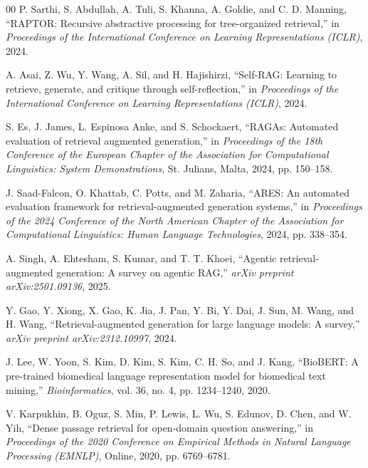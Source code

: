 \documentclass[conference]{IEEEtran}
\begin{document}
\begin{thebibliography}{00}
P. Sarthi, S. Abdullah, A. Tuli, S. Khanna, A. Goldie, and C. D. Manning, ``RAPTOR: Recursive abstractive processing for tree-organized retrieval,'' in \emph{Proceedings of the International Conference on Learning Representations (ICLR)}, 2024.

A. Asai, Z. Wu, Y. Wang, A. Sil, and H. Hajishirzi, ``Self-RAG: Learning to retrieve, generate, and critique through self-reflection,'' in \emph{Proceedings of the International Conference on Learning Representations (ICLR)}, 2024.

S. Es, J. James, L. Espinosa Anke, and S. Schockaert, ``RAGAs: Automated evaluation of retrieval augmented generation,'' in \emph{Proceedings of the 18th Conference of the European Chapter of the Association for Computational Linguistics: System Demonstrations}, St. Julians, Malta, 2024, pp. 150--158.

J. Saad-Falcon, O. Khattab, C. Potts, and M. Zaharia, ``ARES: An automated evaluation framework for retrieval-augmented generation systems,'' in \emph{Proceedings of the 2024 Conference of the North American Chapter of the Association for Computational Linguistics: Human Language Technologies}, 2024, pp. 338--354.

A. Singh, A. Ehtesham, S. Kumar, and T. T. Khoei, ``Agentic retrieval-augmented generation: A survey on agentic RAG,'' \emph{arXiv preprint arXiv:2501.09136}, 2025.

Y. Gao, Y. Xiong, X. Gao, K. Jia, J. Pan, Y. Bi, Y. Dai, J. Sun, M. Wang, and H. Wang, ``Retrieval-augmented generation for large language models: A survey,'' \emph{arXiv preprint arXiv:2312.10997}, 2024.

J. Lee, W. Yoon, S. Kim, D. Kim, S. Kim, C. H. So, and J. Kang, ``BioBERT: A pre-trained biomedical language representation model for biomedical text mining,'' \emph{Bioinformatics}, vol. 36, no. 4, pp. 1234--1240, 2020.

V. Karpukhin, B. Oguz, S. Min, P. Lewis, L. Wu, S. Edunov, D. Chen, and W. Yih, ``Dense passage retrieval for open-domain question answering,'' in \emph{Proceedings of the 2020 Conference on Empirical Methods in Natural Language Processing (EMNLP)}, Online, 2020, pp. 6769--6781.

\end{thebibliography}
\end{document}
